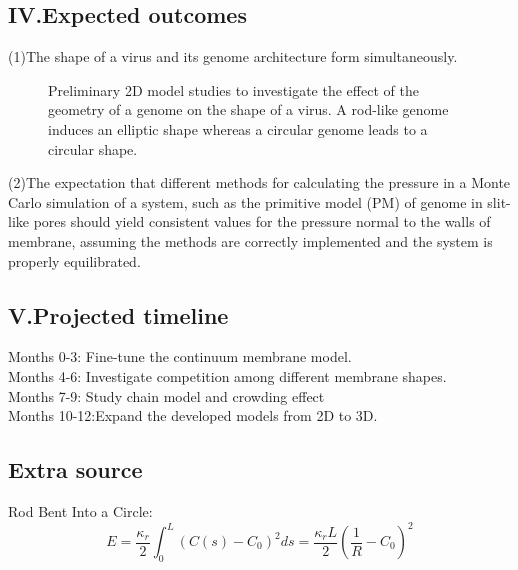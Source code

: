 \documentclass[12pt]{article}
\begin{document}
\begin{flushleft}
\subsection*{IV.Expected outcomes} 
(1)The shape of a virus and its genome architecture form simultaneously.
	
\begin{figure}[!ht]
  \centering
  \caption{Preliminary 2D model studies to
investigate the effect of the geometry of a
genome on the shape of a virus. A rod-like
genome induces an elliptic shape whereas a
circular genome leads to a circular shape\cite{goldsmith2003monkeypox}.}
\end{figure}

(2)The expectation that different methods for calculating the pressure in a Monte Carlo simulation of a system, such as the primitive model (PM) of genome in slit-like pores should yield consistent values for the pressure normal to the walls of membrane, assuming the methods are correctly implemented and the system is properly equilibrated.

\subsection*{V.Projected timeline}

Months 0-3: Fine-tune the continuum membrane model.\\
Months 4-6: Investigate competition among different membrane shapes.\\
Months 7-9: Study chain model and crowding effect\\
Months 10-12:Expand the developed models from 2D to 3D.\\


\newpage

\subsection*{Extra source}
Rod Bent Into a Circle:
\begin{equation}
E = \frac{\kappa_r}{2} \int_0^L \left(C(s) - C_0 \right)^2 ds = \frac{\kappa_r L}{2} \left(\frac{1}{R} - C_0 \right)^2
\end{equation}


\end{flushleft}
\end{document}
